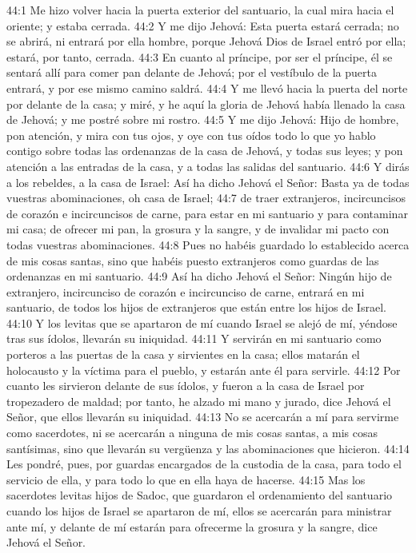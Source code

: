 44:1 Me hizo volver hacia la puerta exterior del santuario, la cual mira hacia el oriente; y estaba cerrada.   
44:2 Y me dijo Jehová: Esta puerta estará cerrada; no se abrirá, ni entrará por ella hombre, porque Jehová Dios de Israel entró por ella; estará, por tanto, cerrada.   
44:3 En cuanto al príncipe, por ser el príncipe, él se sentará allí para comer pan delante de Jehová; por el vestíbulo de la puerta entrará, y por ese mismo camino saldrá.   
44:4 Y me llevó hacia la puerta del norte por delante de la casa; y miré, y he aquí la gloria de Jehová había llenado la casa de Jehová; y me postré sobre mi rostro.   
44:5 Y me dijo Jehová: Hijo de hombre, pon atención, y mira con tus ojos, y oye con tus oídos todo lo que yo hablo contigo sobre todas las ordenanzas de la casa de Jehová, y todas sus leyes; y pon atención a las entradas de la casa, y a todas las salidas del santuario.   
44:6 Y dirás a los rebeldes, a la casa de Israel: Así ha dicho Jehová el Señor: Basta ya de todas vuestras abominaciones, oh casa de Israel;   
44:7 de traer extranjeros, incircuncisos de corazón e incircuncisos de carne, para estar en mi santuario y para contaminar mi casa; de ofrecer mi pan, la grosura y la sangre, y de invalidar mi pacto con todas vuestras abominaciones.   
44:8 Pues no habéis guardado lo establecido acerca de mis cosas santas, sino que habéis puesto extranjeros como guardas de las ordenanzas en mi santuario.   
44:9 Así ha dicho Jehová el Señor: Ningún hijo de extranjero, incircunciso de corazón e incircunciso de carne, entrará en mi santuario, de todos los hijos de extranjeros que están entre los hijos de Israel.   
44:10 Y los levitas que se apartaron de mí cuando Israel se alejó de mí, yéndose tras sus ídolos, llevarán su iniquidad.   
44:11 Y servirán en mi santuario como porteros a las puertas de la casa y sirvientes en la casa; ellos matarán el holocausto y la víctima para el pueblo, y estarán ante él para servirle.   
44:12 Por cuanto les sirvieron delante de sus ídolos, y fueron a la casa de Israel por tropezadero de maldad; por tanto, he alzado mi mano y jurado, dice Jehová el Señor, que ellos llevarán su iniquidad.   
44:13 No se acercarán a mí para servirme como sacerdotes, ni se acercarán a ninguna de mis cosas santas, a mis cosas santísimas, sino que llevarán su vergüenza y las abominaciones que hicieron.   
44:14 Les pondré, pues, por guardas encargados de la custodia de la casa, para todo el servicio de ella, y para todo lo que en ella haya de hacerse.   
44:15 Mas los sacerdotes levitas hijos de Sadoc, que guardaron el ordenamiento del santuario cuando los hijos de Israel se apartaron de mí, ellos se acercarán para ministrar ante mí, y delante de mí estarán para ofrecerme la grosura y la sangre, dice Jehová el Señor.   
